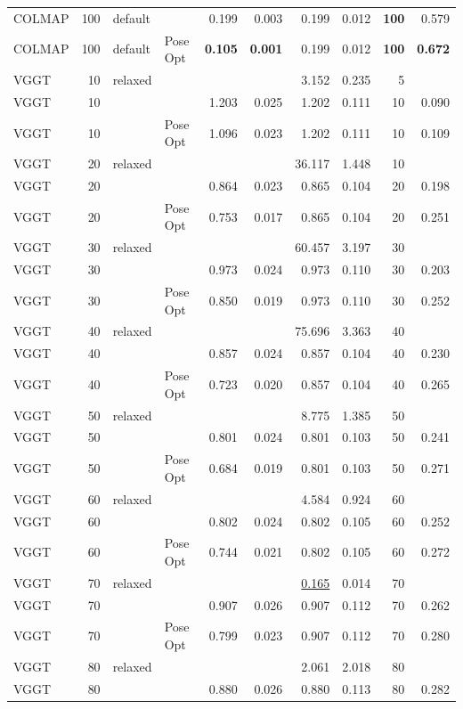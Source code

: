 \begin{table}[H]
\begin{tabular}{lrllrrrrrr}
COLMAP & 100 & default &  & 0.199 & 0.003 & 0.199 & 0.012 & \textbf{100} & 0.579 \\
COLMAP & 100 & default & Pose Opt & \textbf{0.105} & \textbf{0.001} & 0.199 & 0.012 & \textbf{100} & \textbf{0.672} \\
VGGT & 10 & relaxed &  &  &  & 3.152 & 0.235 & 5 &  \\
VGGT & 10 &  &  & 1.203 & 0.025 & 1.202 & 0.111 & 10 & 0.090 \\
VGGT & 10 &  & Pose Opt & 1.096 & 0.023 & 1.202 & 0.111 & 10 & 0.109 \\
VGGT & 20 & relaxed &  &  &  & 36.117 & 1.448 & 10 &  \\
VGGT & 20 &  &  & 0.864 & 0.023 & 0.865 & 0.104 & 20 & 0.198 \\
VGGT & 20 &  & Pose Opt & 0.753 & 0.017 & 0.865 & 0.104 & 20 & 0.251 \\
VGGT & 30 & relaxed &  &  &  & 60.457 & 3.197 & 30 &  \\
VGGT & 30 &  &  & 0.973 & 0.024 & 0.973 & 0.110 & 30 & 0.203 \\
VGGT & 30 &  & Pose Opt & 0.850 & 0.019 & 0.973 & 0.110 & 30 & 0.252 \\
VGGT & 40 & relaxed &  &  &  & 75.696 & 3.363 & 40 &  \\
VGGT & 40 &  &  & 0.857 & 0.024 & 0.857 & 0.104 & 40 & 0.230 \\
VGGT & 40 &  & Pose Opt & 0.723 & 0.020 & 0.857 & 0.104 & 40 & 0.265 \\
VGGT & 50 & relaxed &  &  &  & 8.775 & 1.385 & 50 &  \\
VGGT & 50 &  &  & 0.801 & 0.024 & 0.801 & 0.103 & 50 & 0.241 \\
VGGT & 50 &  & Pose Opt & 0.684 & 0.019 & 0.801 & 0.103 & 50 & 0.271 \\
VGGT & 60 & relaxed &  &  &  & 4.584 & 0.924 & 60 &  \\
VGGT & 60 &  &  & 0.802 & 0.024 & 0.802 & 0.105 & 60 & 0.252 \\
VGGT & 60 &  & Pose Opt & 0.744 & 0.021 & 0.802 & 0.105 & 60 & 0.272 \\
VGGT & 70 & relaxed &  &  &  & \underline{0.165} & 0.014 & 70 &  \\
VGGT & 70 &  &  & 0.907 & 0.026 & 0.907 & 0.112 & 70 & 0.262 \\
VGGT & 70 &  & Pose Opt & 0.799 & 0.023 & 0.907 & 0.112 & 70 & 0.280 \\
VGGT & 80 & relaxed &  &  &  & 2.061 & 2.018 & 80 &  \\
VGGT & 80 &  &  & 0.880 & 0.026 & 0.880 & 0.113 & 80 & 0.282 \\

\end{tabular}
\end{table}
